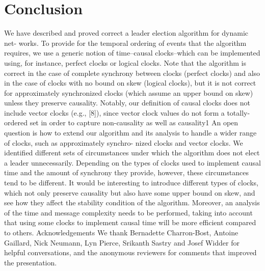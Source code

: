 \chapter{Conclusion}

We have described and proved correct a leader election algorithm for dynamic net- works. To provide for the temporal ordering of events that the algorithm requires, we use a generic notion of time–causal clocks–which can be implemented using, for instance, perfect clocks or logical clocks. Note that the algorithm is correct in the case of complete synchrony between clocks (perfect clocks) and also in the case of clocks with no bound on skew (logical clocks), but it is not correct for approximately synchronized clocks (which assume an upper bound on skew) unless they preserve causality. Notably, our definition of causal clocks does not include vector clocks (e.g., [8]), since vector clock values do not form a totally-ordered set in order to capture non-causality as well as causality1 An open question is how to extend our algorithm and its analysis to handle a wider range of clocks, such as approximately synchro- nized clocks and vector clocks. We identified different sets of circumstances under which the algorithm does not elect a leader unnecessarily. Depending on the types of clocks used to implement causal time and the amount of synchrony they provide, however, these circumstances tend to be different. It would be interesting to introduce different types of clocks, which not only preserve causality but also have some upper bound on skew, and see how they affect the stability condition of the algorithm. Moreover, an analysis of the time and message complexity needs to be performed, taking into account that using some clocks to implement causal time will be more efficient compared to others. Acknowledgements We thank Bernadette Charron-Bost, Antoine Gaillard, Nick Neumann, Lyn Pierce, Srikanth Sastry and Josef Widder for helpful conversations, and the anonymous reviewers for comments that improved the presentation.

